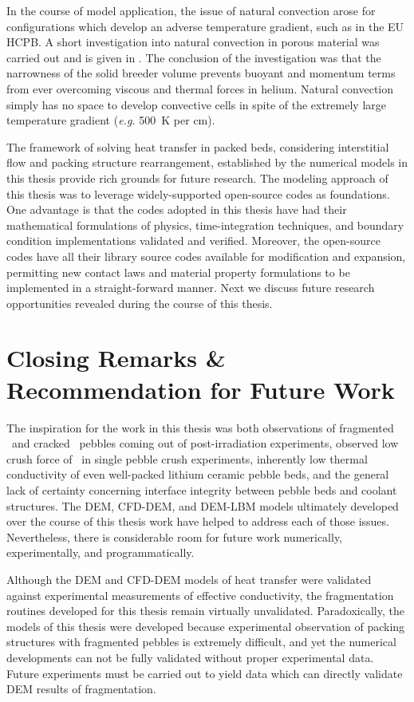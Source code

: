 In the course of model application, the issue of natural convection arose for configurations which develop an adverse temperature gradient, such as in the EU HCPB. A short investigation into natural convection in porous material was carried out and is given in . The conclusion of the investigation was that the narrowness of the solid breeder volume prevents buoyant and momentum terms from ever overcoming viscous and thermal forces in helium. Natural convection simply has no space to develop convective cells in spite of the extremely large temperature gradient (\textit{e.g.} \SI{500}{\kelvin} per \si{\centi\meter}).

The framework of solving heat transfer in packed beds, considering interstitial flow and packing structure rearrangement, established by the numerical models in this thesis provide rich grounds for future research. The modeling approach of this thesis was to leverage widely-supported open-source codes as foundations. One advantage is that the codes adopted in this thesis have had their mathematical formulations of physics, time-integration techniques, and boundary condition implementations validated and verified. Moreover, the open-source codes have all their library source codes available for modification and expansion, permitting new contact laws and material property formulations to be implemented in a straight-forward manner. Next we discuss future research opportunities revealed during the course of this thesis.


\section{Closing Remarks \& Recommendation for Future Work}

The inspiration for the work in this thesis was both observations of fragmented \lis~and cracked \lit~pebbles coming out of post-irradiation experiments, observed low crush force of \lis~in single pebble crush experiments, inherently low thermal conductivity of even well-packed lithium ceramic pebble beds, and the general lack of certainty concerning interface integrity between pebble beds and coolant structures. The DEM, CFD-DEM, and DEM-LBM models ultimately developed over the course of this thesis work have helped to address each of those issues. Nevertheless, there is considerable room for future work numerically, experimentally, and programmatically. 

Although the DEM and CFD-DEM models of heat transfer were validated against experimental measurements of effective conductivity, the fragmentation routines developed for this thesis remain virtually unvalidated. Paradoxically, the models of this thesis were developed because experimental observation of packing structures with fragmented pebbles is extremely difficult, and yet the numerical developments can not be fully validated without proper experimental data. Future experiments must be carried out to yield data which can directly validate DEM results of fragmentation.

